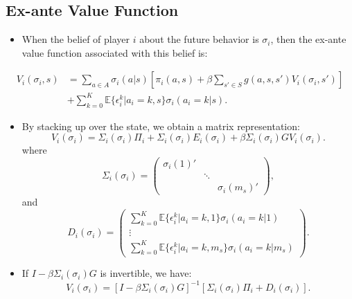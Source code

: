 \documentclass[
]{book}
\providecommand{\tightlist}{%
  \setlength{\itemsep}{0pt}\setlength{\parskip}{0pt}}
\begin{document}
\hypertarget{ex-ante-value-function}{%
\subsection{Ex-ante Value Function}\label{ex-ante-value-function}}

\begin{itemize}
\tightlist
\item
  When the belief of player \(i\) about the future behavior is \(\sigma_i\), then the ex-ante value function associated with this belief is:
\end{itemize}

\begin{equation}
\begin{split}
V_i(\sigma_i, s) &= \sum_{a \in A} \sigma_i(a|s)[\pi_i(a, s) + \beta \sum_{s' \in S} g(a, s, s') V_i(\sigma_i, s')]\\
& + \sum_{k = 0}^K \mathbb{E}\{\epsilon_i^k|a_i = k, s\}\sigma_i(a_i = k|s).
\end{split}
\end{equation}

\begin{itemize}
\tightlist
\item
  By stacking up over the state, we obtain a matrix representation:
  \begin{equation}
  V_i(\sigma_i) = \Sigma_i(\sigma_i) \Pi_i + \Sigma_i(\sigma_i) E_i(\sigma_i) + \beta \Sigma_i(\sigma_i) G V_i(\sigma_i).
  \end{equation}
  where
  \begin{equation}
  \Sigma_i(\sigma_i) = 
  \begin{pmatrix}
  \sigma_i(1)' & & \\
  & \ddots & \\
  & & \sigma_i(m_s)'
  \end{pmatrix},
  \end{equation}
  and
  \begin{equation}
  D_i(\sigma_i) =
  \begin{pmatrix}
  \sum_{k = 0}^K \mathbb{E}\{\epsilon_i^k|a_i = k, 1\}\sigma_i(a_i = k|1)\\
  \vdots\\
  \sum_{k = 0}^K \mathbb{E}\{\epsilon_i^k|a_i = k, m_s\}\sigma_i(a_i = k|m_s)
  \end{pmatrix}.
  \end{equation}
\item
  If \(I - \beta \Sigma_i(\sigma_i)G\) is invertible, we have:
  \[
  V_i(\sigma_i) = [I - \beta \Sigma_i(\sigma_i)G]^{-1}[\Sigma_i(\sigma_i)\Pi_i + D_i(\sigma_i)].
  \]
\end{itemize}
\end{document}
